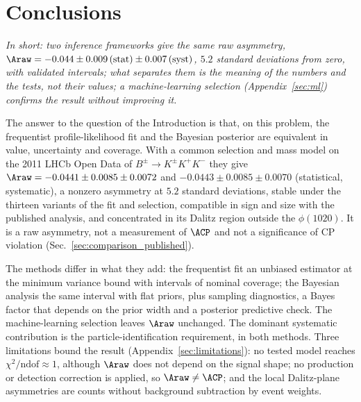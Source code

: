 \section{Conclusions}
\label{sec:conclusions}
\emph{In short: two inference frameworks give the same raw asymmetry, $\Araw=-0.044\pm0.009\,(\text{stat})\pm0.007\,(\text{syst})$, $5.2$ standard deviations from zero, with validated intervals; what separates them is the meaning of the numbers and the tests, not their values; a machine-learning selection (Appendix~\ref{sec:ml}) confirms the result without improving it.}

The answer to the question of the Introduction is that, on this problem, the frequentist profile-likelihood fit and the Bayesian posterior are equivalent in value, uncertainty and coverage. With a common selection and mass model on the 2011 LHCb Open Data of $B^\pm\to K^\pm K^+K^-$ they give $\Araw=-0.0441\pm0.0085\pm0.0072$ and $-0.0443\pm0.0085\pm0.0070$ (statistical, systematic), a nonzero asymmetry at $5.2$ standard deviations, stable under the thirteen variants of the fit and selection, compatible in sign and size with the published analysis, and concentrated in its Dalitz region outside the $\phi(1020)$. It is a raw asymmetry, not a measurement of $\ACP$ and not a significance of CP violation (Sec.~\ref{sec:comparison_published}).

The methods differ in what they add: the frequentist fit an unbiased estimator at the minimum variance bound with intervals of nominal coverage; the Bayesian analysis the same interval with flat priors, plus sampling diagnostics, a Bayes factor that depends on the prior width and a posterior predictive check. The machine-learning selection leaves $\Araw$ unchanged. The dominant systematic contribution is the particle-identification requirement, in both methods. Three limitations bound the result (Appendix~\ref{sec:limitations}): no tested model reaches $\chi^2/\mathrm{ndof}\approx1$, although $\Araw$ does not depend on the signal shape; no production or detection correction is applied, so $\Araw\neq\ACP$; and the local Dalitz-plane asymmetries are counts without background subtraction by event weights.
